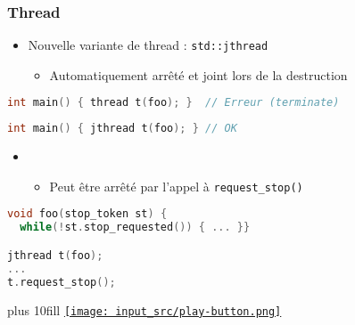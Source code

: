 \documentclass[C++.tex]{subfiles}
\begin{document}
\begin{frame}[fragile]
	\frametitle{Thread}
	\begin{itemize}
		\item Nouvelle variante de thread : \lstinline|std::jthread|
		\begin{itemize}
			\item Automatiquement arrêté et joint lors de la destruction
		\end{itemize}
	\end{itemize}


	\begin{lstlisting}[language=C++]
int main() { thread t(foo); }  // Erreur (terminate)\end{lstlisting}


	\begin{lstlisting}[language=C++]
int main() { jthread t(foo); } // OK\end{lstlisting}

	\begin{itemize}
		\item [] \begin{itemize}
			\item Peut être arrêté par l'appel à \lstinline|request_stop()|
		\end{itemize}
	\end{itemize}

	\begin{lstlisting}[language=C++]
void foo(stop_token st) {
  while(!st.stop_requested()) { ... }}

jthread t(foo);
...
t.request_stop();\end{lstlisting}

	\vskip 10mm plus 10fill
	\hfill
	\href{https://godbolt.org/#g:!((g:!((g:!((h:codeEditor,i:(filename:'1',fontScale:14,fontUsePx:'0',j:1,lang:c%2B%2B,selection:(endColumn:1,endLineNumber:17,positionColumn:1,positionLineNumber:17,selectionStartColumn:1,selectionStartLineNumber:1,startColumn:1,startLineNumber:1),source:'%23include+%3Ciostream%3E%0A%23include+%3Cthread%3E%0A%0Avoid+foo()%0A%7B%0A++std::cout+%3C%3C+%22Foo%5Cn%22%3B%0A%7D%0A%0Aint+main()%0A%7B%0A%23if+1%0A++std::jthread+t(foo)%3B%0A%23else%0A++std::thread+t(foo)%3B%0A%23endif%0A%7D%0A'),l:'5',n:'0',o:'C%2B%2B+source+%231',t:'0')),k:50,l:'4',n:'0',o:'',s:0,t:'0'),(g:!((h:executor,i:(argsPanelShown:'1',compilationPanelShown:'0',compiler:g122,compilerName:'',compilerOutShown:'0',execArgs:'',execStdin:'',fontScale:14,fontUsePx:'0',j:1,lang:c%2B%2B,libs:!((name:boost,ver:'175')),options:'-std%3Dc%2B%2B20+-Wall+-Wextra+-pedantic+-pthread',source:1,stdinPanelShown:'1',tree:'1',wrap:'0'),l:'5',n:'0',o:'Executor+x86-64+gcc+12.2+(C%2B%2B,+Editor+%231)',t:'0')),header:(),k:50,l:'4',n:'0',o:'',s:0,t:'0')),l:'2',n:'0',o:'',t:'0')),version:4}{\texttt{[image: input\_src/play-button.png]}}
\end{frame}
\end{document}
